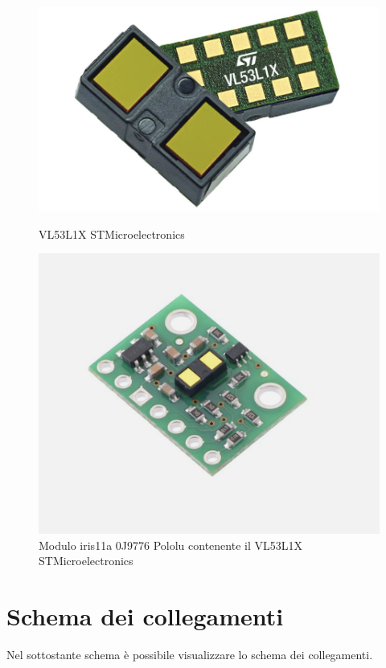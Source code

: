 \begin{figure}[H]
    \centering
    \begin{minipage}{0.45\textwidth}
        \centering
        \includegraphics[width=\textwidth]{images/Immagine_3_VL53L1X.png}
        \caption{VL53L1X STMicroelectronics}
        \label{fig:img1}
    \end{minipage}
    \hfill
    \begin{minipage}{0.45\textwidth}
        \centering
        \includegraphics[width=\textwidth]{images/Immagine_4_Pololu.png}
        \caption{Modulo iris11a 0J9776 Pololu contenente il VL53L1X STMicroelectronics}
        \label{fig:img2}
    \end{minipage}
\end{figure}
\section{Schema dei collegamenti}
Nel sottostante schema è possibile visualizzare lo schema dei collegamenti.
